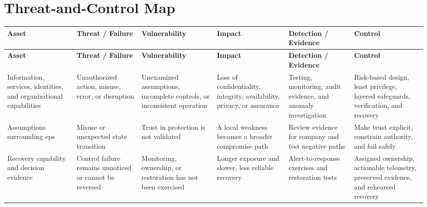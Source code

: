 \documentclass[11pt]{article}
\begin{document}
\section*{Threat-and-Control Map}
\begingroup\scriptsize\setlength{\tabcolsep}{2pt}
\begin{longtable}{>{\RaggedRight\arraybackslash}p{}>{\RaggedRight\arraybackslash}p{}>{\RaggedRight\arraybackslash}p{}>{\RaggedRight\arraybackslash}p{}>{\RaggedRight\arraybackslash}p{}>{\RaggedRight\arraybackslash}p{}}
\toprule\rowcolor{Navy}\color{white}\textbf{Asset} & \color{white}\textbf{Threat / Failure} & \color{white}\textbf{Vulnerability} & \color{white}\textbf{Impact} & \color{white}\textbf{Detection / Evidence} & \color{white}\textbf{Control}\\\midrule
\endfirsthead
\toprule\rowcolor{Navy}\color{white}\textbf{Asset} & \color{white}\textbf{Threat / Failure} & \color{white}\textbf{Vulnerability} & \color{white}\textbf{Impact} & \color{white}\textbf{Detection / Evidence} & \color{white}\textbf{Control}\\\midrule
\endhead
Information, services, identities, and organizational capabilities & Unauthorized action, misuse, error, or disruption & Unexamined assumptions, incomplete controls, or inconsistent operation & Loss of confidentiality, integrity, availability, privacy, or assurance & Testing, monitoring, audit evidence, and anomaly investigation & Risk-based design, least privilege, layered safeguards, verification, and recovery\\\midrule
Assumptions surrounding eps & Misuse or unexpected state transition & Trust in protection is not validated & A local weakness becomes a broader compromise path & Review evidence for company and test negative paths & Make trust explicit, constrain authority, and fail safely\\\midrule
Recovery capability and decision evidence & Control failure remains unnoticed or cannot be reversed & Monitoring, ownership, or restoration has not been exercised & Longer exposure and slower, less reliable recovery & Alert-to-response exercises and restoration tests & Assigned ownership, actionable telemetry, preserved evidence, and rehearsed recovery\\\midrule
\bottomrule
\end{longtable}
\endgroup
\end{document}
